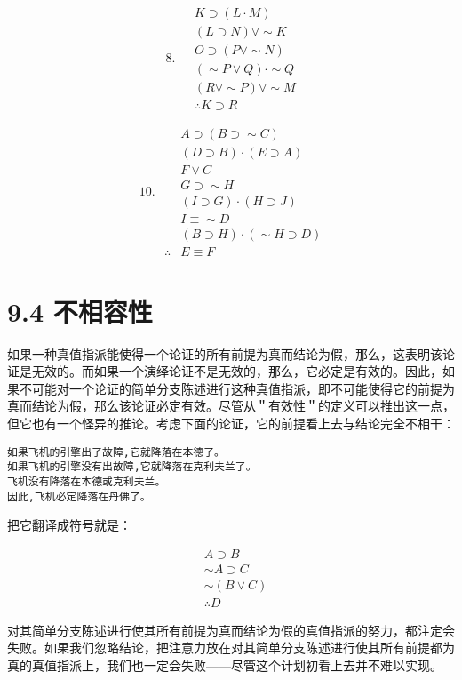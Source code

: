 $$
\text { 8. } \begin{aligned}
& K \supset(L \cdot M) \\
& (L \supset N) \vee \sim K \\
& O \supset(P \vee \sim N) \\
& (\sim P \vee Q) \cdot \sim Q \\
& (R \vee \sim P) \vee \sim M \\
& \therefore K \supset R
\end{aligned}
$$

$$
\text { 10. } \begin{aligned}
& A \supset(B \supset \sim C) \\
& (D \supset B) \cdot(E \supset A) \\
& F \vee C \\
& G \supset \sim H \\
& (I \supset G) \cdot(H \supset J) \\
& I \equiv \sim D \\
& (B \supset H) \cdot(\sim H \supset D) \\
\therefore & E \equiv F
\end{aligned}
$$

\section*{9.4 不相容性}
如果一种真值指派能使得一个论证的所有前提为真而结论为假，那么，这表明该论证是无效的。而如果一个演绎论证不是无效的，那么，它必定是有效的。因此，如果不可能对一个论证的简单分支陈述进行这种真值指派，即不可能使得它的前提为真而结论为假，那么该论证必定有效。尽管从＂有效性＂的定义可以推出这一点，但它也有一个怪异的推论。考虑下面的论证，它的前提看上去与结论完全不相干：

\begin{verbatim}
如果飞机的引擎出了故障,它就降落在本德了。
如果飞机的引擎没有出故障,它就降落在克利夫兰了。
飞机没有降落在本德或克利夫兰。
因此,飞机必定降落在丹佛了。
\end{verbatim}

把它翻译成符号就是：

$$
\begin{aligned}
& A \supset B \\
& \sim A \supset C \\
& \sim(B \vee C) \\
& \therefore D
\end{aligned}
$$

对其简单分支陈述进行使其所有前提为真而结论为假的真值指派的努力，都注定会失败。如果我们忽略结论，把注意力放在对其简单分支陈述进行使其所有前提都为真的真值指派上，我们也一定会失败——尽管这个计划初看上去并不难以实现。

